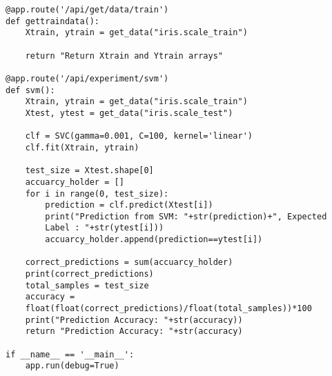 \begin{lstlisting}
@app.route('/api/get/data/train')
def gettraindata():
    Xtrain, ytrain = get_data("iris.scale_train")
    
    return "Return Xtrain and Ytrain arrays"

@app.route('/api/experiment/svm')
def svm():
    Xtrain, ytrain = get_data("iris.scale_train")
    Xtest, ytest = get_data("iris.scale_test")

    clf = SVC(gamma=0.001, C=100, kernel='linear')
    clf.fit(Xtrain, ytrain)

    test_size = Xtest.shape[0]
    accuarcy_holder = []
    for i in range(0, test_size):
        prediction = clf.predict(Xtest[i])
        print("Prediction from SVM: "+str(prediction)+", Expected
        Label : "+str(ytest[i]))
        accuarcy_holder.append(prediction==ytest[i])

    correct_predictions = sum(accuarcy_holder)
    print(correct_predictions)
    total_samples = test_size
    accuracy =
    float(float(correct_predictions)/float(total_samples))*100
    print("Prediction Accuracy: "+str(accuracy))
    return "Prediction Accuracy: "+str(accuracy)

if __name__ == '__main__':
    app.run(debug=True)
\end{lstlisting}


\begin{comment}
\section{Draft: Deep Learning}

\section{Draft: Time Series}
\subsection{Overview of Time-Series Data}
This section will explore the make up of time-series (TS) data, and
the fundamental concepts needed to analyze TS date. More importantly
why simple linear regression models cannot be used. 
\subsection{Why is TS Data Important?}
This section will explore the application and relevance of TS data
with respect to big-data. 
\subsection{Forecasting TS data}
This section will explore TS forecasting methods such as the ARIMA
model, ARCH/GARCH model, Vector Autoregression model, LSTM model and
NARX Networks...time permitting ELMAN and JORDAN networks. 
 
\end{comment}
